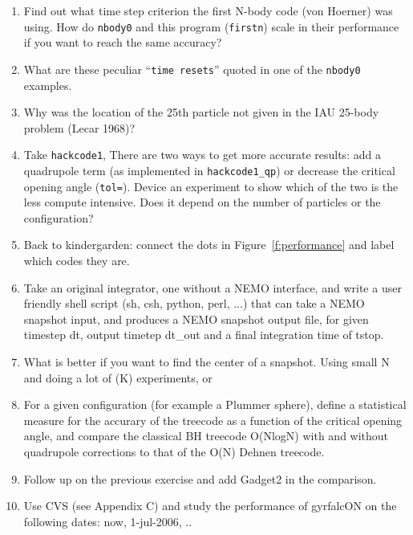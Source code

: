 \begin{enumerate}

\item 
Find out what time step criterion the first N-body code (von Hoerner)
was using. How do {\tt nbody0} and this program ({\tt firstn})
scale in their performance if you want to reach the same accuracy?

\item
What are these peculiar ``{\tt time resets}'' quoted in one of the {\tt nbody0}
examples.

\item
Why was the location of the 25th particle not given in the IAU 25-body problem
(Lecar 1968)?

\item
Take {\tt hackcode1}, There are two ways to get more accurate results:
add a quadrupole term (as implemented in {\tt hackcode1\_qp}) or decrease
the critical opening angle ({\tt tol=}). Device an experiment to show
which of the two is the less compute intensive. Does it depend on the 
number of particles or the configuration?

\item
Back to kindergarden: connect the dots in Figure~\ref{f:performance}
and label which codes they are.


\item
Take an original 
integrator, one without a NEMO interface, and write a user
friendly shell script (sh, csh, python, perl, ...) that can take a
NEMO snapshot input, and produces a NEMO snapshot output file, for
given timestep dt, output timetep dt\_out and a final integration
time of tstop.

\item
What is better if you want to find the center of a snapshot.
Using small N and doing a lot of (K) experiments, or 

\item
For a given configuration (for example a Plummer sphere), define a statistical
measure for the accurary of the treecode as a function of the critical
opening angle, and compare the classical BH treecode O(NlogN) with and
without quadrupole corrections to that of the O(N) Dehnen treecode.

\item
Follow up on the previous exercise and add Gadget2 in the comparison.

\item
Use CVS (see Appendix C) and study the performance of gyrfalcON on the following
dates:  now, 1-jul-2006, ..

\end{enumerate}


